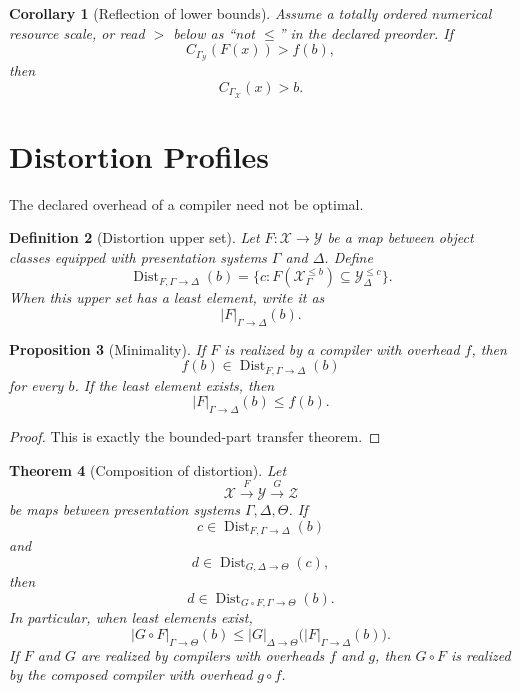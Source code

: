 \documentclass[11pt]{article}
\newtheorem{theorem}{Theorem}[section]
\newtheorem{proposition}[theorem]{Proposition}
\newtheorem{corollary}[theorem]{Corollary}
\newtheorem{definition}[theorem]{Definition}
\begin{document}
\begin{corollary}[Reflection of lower bounds]
Assume a totally ordered numerical resource scale, or read \(>\) below as ``not \(\leq\)'' in the declared preorder.
If
\[
C_{\Gamma_\mathcal Y}(F(x))>f(b),
\]
then
\[
C_{\Gamma_\mathcal X}(x)>b.
\]
\end{corollary}

\section{Distortion Profiles}

The declared overhead of a compiler need not be optimal.

\begin{definition}[Distortion upper set]
Let \(F:\mathcal X\to\mathcal Y\) be a map between object classes equipped with presentation systems \(\Gamma\) and \(\Delta\). Define
\[
\operatorname{Dist}_{F,\Gamma\to\Delta}(b)
=
\{c:F(\mathcal X_\Gamma^{\leq b})\subseteq \mathcal Y_\Delta^{\leq c}\}.
\]
When this upper set has a least element, write it as
\[
|F|_{\Gamma\to\Delta}(b).
\]
\end{definition}

\begin{proposition}[Minimality]
If \(F\) is realized by a compiler with overhead \(f\), then
\[
f(b)\in \operatorname{Dist}_{F,\Gamma\to\Delta}(b)
\]
for every \(b\). If the least element exists, then
\[
|F|_{\Gamma\to\Delta}(b)\leq f(b).
\]
\end{proposition}

\begin{proof}
This is exactly the bounded-part transfer theorem.
\end{proof}

\begin{theorem}[Composition of distortion]
Let
\[
\mathcal X\xrightarrow{F}\mathcal Y\xrightarrow{G}\mathcal Z
\]
be maps between presentation systems \(\Gamma,\Delta,\Theta\). If
\[
c\in\operatorname{Dist}_{F,\Gamma\to\Delta}(b)
\]
and
\[
d\in\operatorname{Dist}_{G,\Delta\to\Theta}(c),
\]
then
\[
d\in\operatorname{Dist}_{G\circ F,\Gamma\to\Theta}(b).
\]
In particular, when least elements exist,
\[
|G\circ F|_{\Gamma\to\Theta}(b)
\leq
|G|_{\Delta\to\Theta}\bigl(|F|_{\Gamma\to\Delta}(b)\bigr).
\]
If \(F\) and \(G\) are realized by compilers with overheads \(f\) and \(g\), then \(G\circ F\) is realized by the composed compiler with overhead \(g\circ f\).
\end{theorem}
\end{document}
